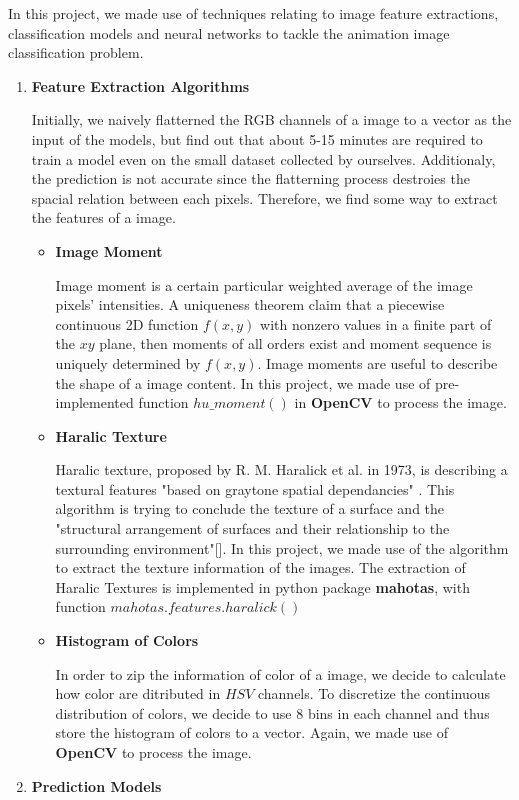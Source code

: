 \documentclass[11.5pt]{article}
\begin{document}
    In this project, we made use of techniques relating to image feature extractions, classification models and neural networks to tackle the animation image classification problem.

    \begin{enumerate}
        \item \textbf{Feature Extraction Algorithms}
        
        Initially, we naively flatterned the RGB channels of a image to a vector as the input of the models, but find out that about 5-15 minutes are required to train a model even on the small dataset collected by ourselves. Additionaly, the prediction is not accurate since the flatterning process destroies the spacial relation between each pixels. Therefore, we find some way to extract the features of a image.
        \begin{itemize}
            \item \textbf{Image Moment}
            
            Image moment is a certain particular weighted average of the image pixels' intensities. A uniqueness theorem \cite{img_moment} claim that a piecewise continuous 2D function $f(x,y)$ with nonzero values in a finite part of the $xy$ plane, then moments of all orders exist and moment sequence is uniquely determined by $f(x,y)$. Image moments are useful to describe the shape of a image content. In this project, we made use of pre-implemented function $hu\_moment()$ in \textbf{OpenCV}\cite{opencv_library} to process the image.
            \item \textbf{Haralic Texture}
            
            Haralic texture, proposed by R. M. Haralick et al. in 1973, is describing a textural features "based on graytone spatial dependancies" \cite{haralick}. This algorithm is trying to conclude the texture of a surface and the "structural arrangement of surfaces and their relationship to the surrounding environment"[]. In this project, we made use of the algorithm to extract the texture information of the images. The extraction of Haralic Textures is implemented in python package \textbf{mahotas}\cite{mahotas}, with function $mahotas.features.haralick()$
            \item \textbf{Histogram of Colors}
            
            In order to zip the information of color of a image, we decide to calculate how color are ditributed in $HSV$ channels. To discretize the continuous distribution of colors, we decide to use 8 bins in each channel and thus store the histogram of colors to a vector. Again, we made use of \textbf{OpenCV}\cite{opencv_library} to process the image.
        \end{itemize}
        \item \textbf{Prediction Models}
        

\end{enumerate}
\end{document}
